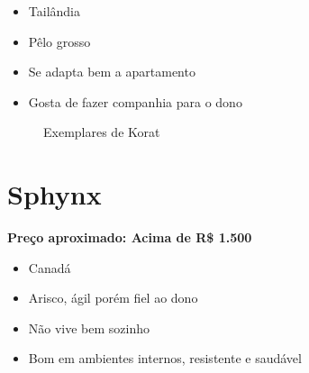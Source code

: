 \documentclass[a4paper]{article}
\begin{document}
  \begin{itemize}
    \item Tail\^andia
    \item P\^elo grosso
    \item Se adapta bem a apartamento
    \item Gosta de fazer companhia para o dono
  \end{itemize}

  \begin{figure}[ht]
    \centering


    \caption{Exemplares de Korat}
    \label{fig:korat}
  \end{figure}

  \section{Sphynx}

  \bf{Pre\c{c}o aproximado:} Acima de R\$ 1.500

  \begin{itemize}
    \item Canad\'a
    \item Arisco, \'agil por\'em fiel ao dono
    \item N\~ao vive bem sozinho
    \item Bom em ambientes internos, resistente e saud\'avel
  \end{itemize}
\end{document}
